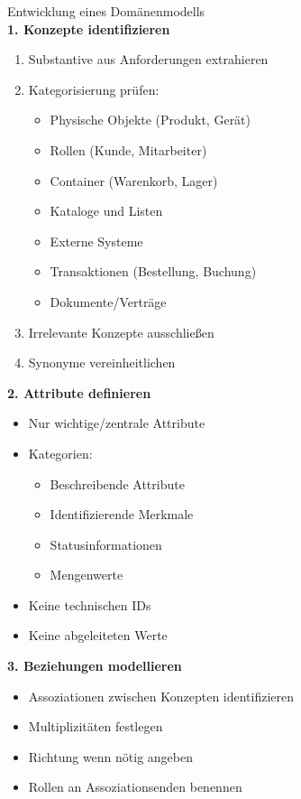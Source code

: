 \begin{KR}{Entwicklung eines Domänenmodells}\\
\textbf{1. Konzepte identifizieren}
\begin{enumerate}
    \item Substantive aus Anforderungen extrahieren
    \item Kategorisierung prüfen:
    \begin{itemize}
        \item Physische Objekte (Produkt, Gerät)
        \item Rollen (Kunde, Mitarbeiter)
        \item Container (Warenkorb, Lager)
        \item Kataloge und Listen
        \item Externe Systeme
        \item Transaktionen (Bestellung, Buchung)
        \item Dokumente/Verträge
    \end{itemize}
    \item Irrelevante Konzepte ausschließen
    \item Synonyme vereinheitlichen
\end{enumerate}

\textbf{2. Attribute definieren}
\begin{itemize}
    \item Nur wichtige/zentrale Attribute
    \item Kategorien:
    \begin{itemize}
        \item Beschreibende Attribute
        \item Identifizierende Merkmale
        \item Statusinformationen
        \item Mengenwerte
    \end{itemize}
    \item Keine technischen IDs
    \item Keine abgeleiteten Werte
\end{itemize}

\textbf{3. Beziehungen modellieren}
\begin{itemize}
    \item Assoziationen zwischen Konzepten identifizieren
    \item Multiplizitäten festlegen
    \item Richtung wenn nötig angeben
    \item Rollen an Assoziationsenden benennen
\end{itemize}
\end{KR}

